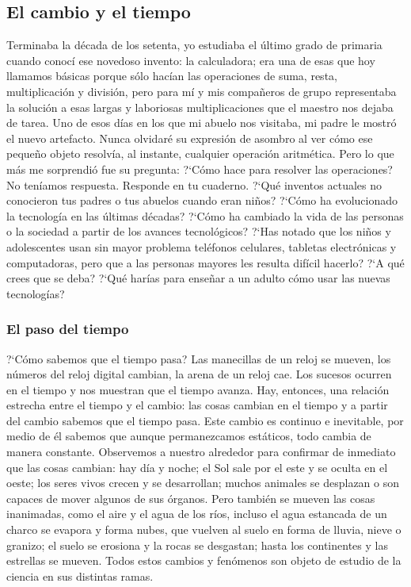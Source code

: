 \documentclass[11pt]{book}
\begin{document}
\subsection{El cambio y el tiempo}
Terminaba la d\'ecada de los setenta, yo estudiaba el \'ultimo grado de primaria
cuando conoc\'i ese novedoso invento:
la calculadora; era una de esas que hoy llamamos b\'asicas porque s\'olo hac\'ian las
operaciones de suma, resta, multiplicaci\'on
y divisi\'on, pero para m\'i y mis compañeros de grupo representaba la soluci\'on a
esas largas y laboriosas multiplicaciones
que el maestro nos dejaba de tarea.
Uno de esos d\'ias en los que mi abuelo nos visitaba, mi padre le mostr\'o el nuevo
artefacto. Nunca olvidar\'e su expresi\'on
de asombro al ver c\'omo ese pequeño objeto resolv\'ia, al instante, cualquier
operaci\'on aritm\'etica. Pero lo que m\'as me sorprendi\'o fue su pregunta:
?`Cómo hace para resolver las operaciones?
No ten\'iamos respuesta.
Responde en tu cuaderno.
?`Qu\'e inventos actuales no conocieron tus padres o tus abuelos cuando eran
niños?
?`C\'omo ha evolucionado la tecnolog\'ia en las \'ultimas d\'ecadas? ?`C\'omo ha cambiado
la vida de las personas o la sociedad a partir
de los avances tecnol\'ogicos?
?`Has notado que los niños y adolescentes usan sin mayor problema tel\'efonos
celulares, tabletas electr\'onicas y computadoras,
pero que a las personas mayores les resulta dif\'icil hacerlo? ?`A qu\'e crees que
se deba?
?`Qu\'e har\'ias para enseñar a un adulto c\'omo usar las nuevas tecnolog\'ias?
\subsubsection{El paso del tiempo}

?`C\'omo sabemos que el tiempo pasa? Las manecillas de un reloj se mueven, los
n\'umeros del reloj digital cambian, la arena de un
reloj cae. Los sucesos ocurren en el tiempo y nos muestran que el tiempo
avanza. Hay, entonces, una relaci\'on estrecha entre el
tiempo y el cambio: las cosas cambian en el tiempo y a partir del cambio
sabemos que el tiempo pasa. Este cambio es continuo e
inevitable, por medio de \'el sabemos que aunque permanezcamos est\'aticos, todo
cambia de manera constante.
Observemos a nuestro alrededor para confirmar de inmediato que las cosas
cambian: hay d\'ia y noche; el Sol sale por el este y
se oculta en el oeste; los seres vivos crecen y se desarrollan; muchos animales
se desplazan o son capaces de mover algunos de
sus \'organos. Pero tambi\'en se mueven las cosas inanimadas, como el aire y el
agua de los r\'ios, incluso el agua estancada de un
charco se evapora y forma nubes, que vuelven al suelo en forma de lluvia, nieve
o granizo; el suelo se erosiona y la rocas se
desgastan; hasta los continentes y las estrellas se mueven. Todos estos cambios
y fen\'omenos son objeto de estudio de la ciencia
en sus distintas ramas.
\end{document}
